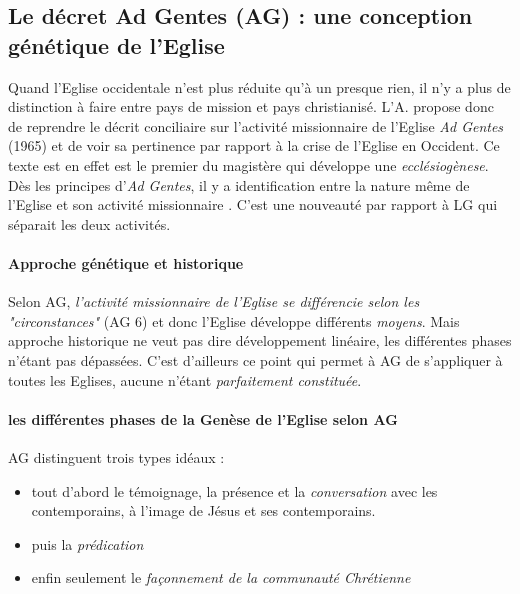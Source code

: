 \subsection{Le décret Ad Gentes (AG) : une conception génétique de l'Eglise} Quand l'Eglise occidentale n'est plus réduite qu'à un presque rien, il n'y a plus de distinction à faire entre pays de mission et pays christianisé. L'A. propose donc de reprendre le décrit conciliaire sur l'activité missionnaire de l'Eglise \textit{Ad Gentes} (1965) et de voir sa pertinence par rapport à la crise de l'Eglise en Occident. 
Ce texte est en effet est le premier du magistère qui développe une \textit{ecclésiogènese}. Dès les principes d'\textit{Ad Gentes}, il y a identification entre la nature même de l'Eglise et son activité missionnaire .  C'est une nouveauté par rapport à LG qui séparait les deux activités. 

\paragraph{Approche génétique et historique } Selon AG, \textit{l'activité missionnaire de l'Eglise se différencie selon les "circonstances"} (AG 6) et donc l'Eglise développe différents \textit{moyens}. Mais approche historique ne veut pas dire développement linéaire, les différentes phases n'étant pas dépassées. C'est d'ailleurs ce point qui permet à AG de s'appliquer à toutes les Eglises, aucune n'étant \textit{parfaitement constituée}.

\paragraph{les différentes phases de la Genèse de l'Eglise selon AG} AG distinguent trois types idéaux : 
\begin{itemize}
    \item tout d'abord le témoignage, la présence et la \textit{conversation} avec les contemporains, à l'image de Jésus et ses contemporains.
    \item puis la \textit{prédication}
    \item enfin seulement le \textit{façonnement de la communauté Chrétienne}
    
\end{itemize}


